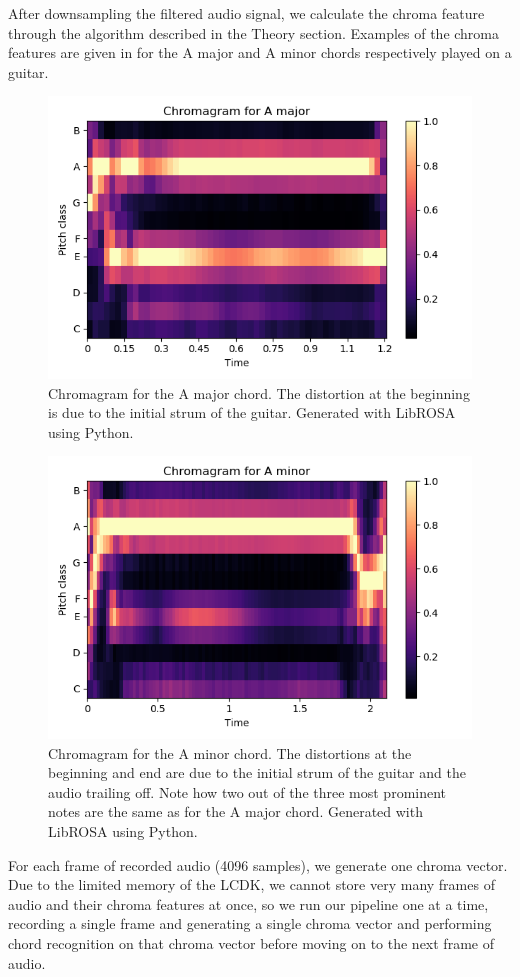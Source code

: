 \documentclass[journal]{IEEEtran}
\begin{document}
After downsampling the filtered audio signal, we calculate the chroma feature through the algorithm described in the Theory section.
Examples of the chroma features are given in  for the A major and A minor chords respectively played on a guitar.
\begin{figure}[!t]
    \centering
    \includegraphics[width = \linewidth]{../Figures/chromagram_a_major}
    \caption{Chromagram for the A major chord.
    The distortion at the beginning is due to the initial strum of the guitar.
    Generated with LibROSA using Python.}
    \label{fig:a_major}
\end{figure}
\begin{figure}[!t]
    \centering
    \includegraphics[width = \linewidth]{../Figures/chromagram_a_minor}
    \caption{Chromagram for the A minor chord.
    The distortions at the beginning and end are due to the initial strum of the guitar and the audio trailing off.
    Note how two out of the three most prominent notes are the same as for the A major chord.
    Generated with LibROSA using Python.}
    \label{fig:a_minor}
\end{figure}
For each frame of recorded audio (4096 samples), we generate one chroma vector.
Due to the limited memory of the LCDK, we cannot store very many frames of audio and their chroma features at once, so we run our pipeline one at a time, recording a single frame and generating a single chroma vector and performing chord recognition on that chroma vector before moving on to the next frame of audio.
\end{document}
